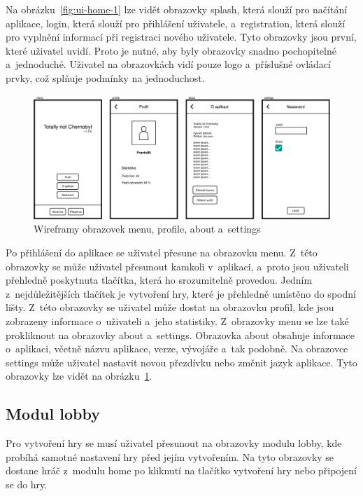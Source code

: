 Na obrázku~\ref{fig:ui-home-1} lze vidět obrazovky splash,
která slouží pro načítání aplikace,
login,
která slouží pro přihlášení uživatele,
a~registration,
která slouží pro vyplnění informací při registraci nového uživatele.
Tyto obrazovky jsou první,
které uživatel uvidí.
Proto je nutné,
aby byly obrazovky snadno pochopitelné a~jednoduché.
Uživatel na obrazovkách vidí pouze logo a~příslušné ovládací prvky,
což splňuje podmínky na jednoduchost.  

\begin{figure}
    \centering
    \includegraphics[width=1\linewidth]{assets/design/wireframes/home-2.pdf}
    \caption{Wireframy obrazovek menu, profile, about a~settings}
    \label{fig:ui-home-2}
\end{figure}

Po přihlášení do aplikace se uživatel přesune na obrazovku menu.
Z~této obrazovky se může uživatel přesunout kamkoli v~aplikaci,
a~proto jsou uživateli přehledně poskytnuta tlačítka,
která ho srozumitelně provedou.
Jedním z~nejdůležitějších tlačítek je vytvoření hry,
které je přehledně umístěno do spodní lišty.
Z~této obrazovky se uživatel může dostat na obrazovku profil,
kde jsou zobrazeny informace o~uživateli a~jeho statistiky.
Z~obrazovky menu se lze také prokliknout na obrazovky about a~settings.
Obrazovka about obsahuje informace o~aplikaci,
včetně názvu aplikace, verze, vývojáře a~tak podobně.
Na obrazovce settings může uživatel nastavit novou přezdívku nebo změnit jazyk
aplikace.
Tyto obrazovky lze vidět na obrázku~\ref{fig:ui-home-2}.

\subsection{Modul lobby}

Pro vytvoření hry se musí uživatel přesunout na obrazovky modulu lobby,
kde probíhá samotné nastavení hry před jejím vytvořením.
Na tyto obrazovky se dostane hráč z~modulu home po kliknutí na tlačítko
vytvoření hry nebo připojení se do hry.

